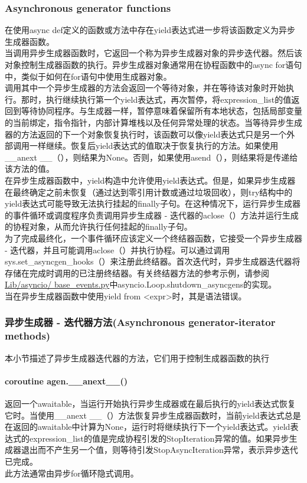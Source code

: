\documentclass[10pt,UTF8]{ctexart}
\begin{document}
\subsubsection{Asynchronous generator functions}
在使用async def定义的函数或方法中存在yield表达式进一步将该函数定义为异步生成器函数。\\
\indent 当调用异步生成器函数时，它返回一个称为异步生成器对象的异步迭代器。然后该对象控制生成器函数的执行。异步生成器对象通常用在协程函数中的async for语句中，类似于如何在for语句中使用生成器对象。\\
\indent 调用其中一个异步生成器的方法会返回一个等待对象，并在等待该对象时开始执行。那时，执行继续执行第一个yield表达式，再次暂停，将expression_list的值返回到等待协同程序。与生成器一样，暂停意味着保留所有本地状态，包括局部变量的当前绑定，指令指针，内部计算堆栈以及任何异常处理的状态。当等待异步生成器的方法返回的下一个对象恢复执行时，该函数可以像yield表达式只是另一个外部调用一样继续。恢复后yield表达式的值取决于恢复执行的方法。如果使用__anext __（），则结果为None。否则，如果使用asend（），则结果将是传递给该方法的值。\\
\indent 在异步生成器函数中，yield构造中允许使用yield表达式。但是，如果异步生成器在最终确定之前未恢复（通过达到零引用计数或通过垃圾回收），则try结构中的yield表达式可能导致无法执行挂起的finally子句。在这种情况下，运行异步生成器的事件循环或调度程序负责调用异步生成器 - 迭代器的aclose（）方法并运行生成的协程对象，从而允许执行任何挂起的finally子句。\\
\indent 为了完成最终化，一个事件循环应该定义一个终结器函数，它接受一个异步生成器 - 迭代器，并且可能调用aclose（）并执行协程。可以通过调用sys.set_asyncgen_hooks（）来注册此终结器。首次迭代时，异步生成器迭代器将存储在完成时调用的已注册终结器。有关终结器方法的参考示例，请参阅\href{https://github.com/python/cpython/blob/3.7/Lib/asyncio/base_events.py}{Lib/asyncio/ base_events.py}中asyncio.Loop.shutdown_asyncgens的实现。\\
\indent 当在异步生成器函数中使用yield from <expr>时，其是语法错误。
\subsubsection{异步生成器 - 迭代器方法(Asynchronous generator-iterator methods)}
本小节描述了异步生成器迭代器的方法，它们用于控制生成器函数的执行
\paragraph{coroutine agen.__anext__()}返回一个awaitable，当运行开始执行异步生成器或在最后执行的yield表达式恢复它时。当使用__anext __（）方法恢复异步生成器函数时，当前yield表达式总是在返回的awaitable中计算为None，运行时将继续执行下一个yield表达式。yield表达式的expression_list的值是完成协程引发的StopIteration异常的值。如果异步生成器退出而不产生另一个值，则等待引发StopAsyncIteration异常，表示异步迭代已完成。\\
\indent 此方法通常由异步for循环隐式调用。
\end{document}
